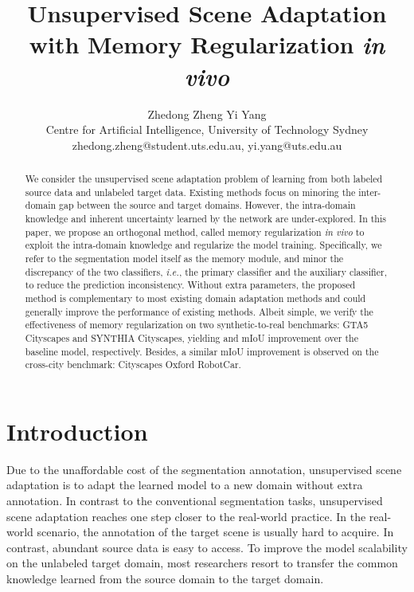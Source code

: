 \documentclass{article}
\def\ie{\emph{i.e.}}
\begin{document}
\title{Unsupervised Scene Adaptation with Memory Regularization \emph{in vivo}}

\author{
  Zhedong Zheng \quad Yi Yang  \\ 
  \affiliations
  Centre for Artificial Intelligence, University of Technology Sydney  \\
  \emails
zhedong.zheng@student.uts.edu.au, yi.yang@uts.edu.au
}


\maketitle


\begin{abstract}
We consider the unsupervised scene adaptation problem of learning from both labeled source data and unlabeled target data. Existing methods focus on minoring the inter-domain gap between the source and target domains. However, the intra-domain knowledge and inherent uncertainty learned by the network are under-explored. In this paper, we propose an orthogonal method, called memory regularization \emph{in vivo} to exploit the intra-domain knowledge and regularize the model training. Specifically, we refer to the segmentation model itself as the memory module, and minor the discrepancy of the two classifiers, \ie, the primary classifier and the auxiliary classifier, to reduce the prediction inconsistency.
Without extra parameters, the proposed method is complementary to most existing domain adaptation methods and could generally improve the performance of existing methods. Albeit simple, we verify the effectiveness of memory regularization on two synthetic-to-real benchmarks: GTA5  Cityscapes and SYNTHIA  Cityscapes, yielding  and  mIoU improvement over the baseline model, respectively. Besides, a similar  mIoU improvement is observed on the cross-city benchmark:  Cityscapes  Oxford RobotCar.
\end{abstract}

\section{Introduction}
Due to the unaffordable cost of the segmentation annotation, unsupervised scene adaptation is to adapt the learned model to a new domain without extra annotation. In contrast to the conventional segmentation tasks, unsupervised scene adaptation reaches one step closer to the real-world practice. In the real-world scenario, the annotation of the target scene is usually hard to acquire. In contrast, abundant source data is easy to access. To improve the model scalability on the unlabeled target domain, most researchers resort to transfer the common knowledge learned from the source domain to the target domain.
\end{document}
